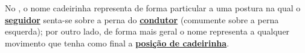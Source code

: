 No \AnoLivro, o nome cadeirinha representa de forma particular a uma postura na qual o \hyperref[def:Seguidor]{\textbf{seguidor}} 
senta-se sobre a perna do \hyperref[def:Condutor]{\textbf{condutor}}  (comumente sobre a perna esquerda);
por outro lado, de forma mais geral  o nome representa a qualquer movimento que tenha como final a 
\hyperref[def:cadeirinha-position]{\textbf{posição de cadeirinha}}.

